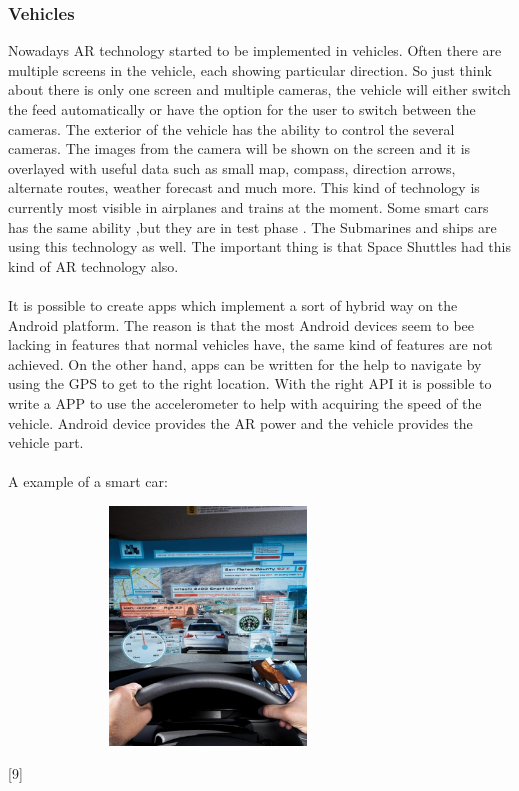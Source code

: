 \subsubsection{Vehicles}
Nowadays AR technology started to be implemented in vehicles. Often there are multiple screens in the vehicle, each showing particular direction. So just think about there is only one screen and multiple cameras, the vehicle will either switch the feed automatically or have the option for the user to switch  between the cameras. The exterior of the vehicle has the ability to control the several cameras. The images from the camera will be shown on the screen and it is overlayed with useful data such as small map, compass, direction arrows, alternate routes, weather forecast and much more. This kind of technology is currently most visible in airplanes and trains at the moment. Some smart cars has the same ability ,but they are in test phase . The Submarines and ships are using this technology as well. The important thing is that Space Shuttles had this kind of AR technology also.
\\
\\
It is possible to create apps which implement a sort of hybrid way on the Android platform. The reason is that the most Android devices seem to bee lacking in features that normal vehicles have, the same kind of features are not achieved. On the other hand, apps can be written for the help to navigate by using the GPS to get to the right location.  With the right API it is possible to write a APP to use the accelerometer to help with  acquiring the speed of the vehicle. Android device provides the AR power and the vehicle  provides the vehicle part.
\\
\\
A example of a smart car:
\begin{figure}[htbp]
\centering
\includegraphics[width=240pt,height=180pt,keepaspectratio]{graphics/smartcar.png}
\caption{\cite{javaObjectClass}}
\end{figure}
[9]
